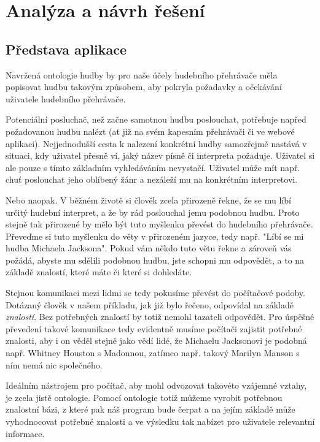 \chapter{Analýza a návrh řešení}

\section{Představa aplikace}
\label{chapter:requirements}

Navržená ontologie hudby by pro naše účely hudebního přehrávače měla popisovat hudbu takovým způsobem, aby pokryla požadavky a očekávání uživatele hudebního přehrávače.


Potenciální posluchač, než začne samotnou hudbu poslouchat, potřebuje napřed požadovanou hudbu nalézt (ať již na svém kapesním přehrávači či ve webové aplikaci).
Nejjednodušší cesta k nalezení konkrétní hudby samozřejmě nastává v situaci, kdy uživatel přesně ví, jaký název písně či interpreta požaduje. Uživatel si ale pouze s tímto základním vyhledáváním nevystačí.
Uživatel může mít např. chuť poslouchat jeho oblíbený žánr a nezáleží mu na konkrétním interpretovi. 

Nebo naopak. V běžném životě si člověk zcela přirozeně řekne, že se mu líbí určitý hudební interpret, a že by rád poslouchal jemu podobnou hudbu. Proto stejně tak přirozené by mělo být tuto myšlenku převést do hudebního přehrávače.
Převeďme si tuto myšlenku do věty v přirozeném jazyce, tedy např. "Líbí se mi hudba Michaela Jacksona". 
Pokud vám někdo tuto větu řekne a zároveň vás požádá, abyste mu sdělili podobnou hudbu, jste schopni mu odpovědět, a to na základě znalostí, které máte či které si dohledáte.
 
Stejnou komunikaci mezi lidmi se tedy pokusíme převést do počítačové podoby. 
Dotázaný člověk v našem příkladu, jak již bylo řečeno, odpovídal na základě \textit{znalostí}. Bez potřebných znalostí by totiž nemohl tazateli odpovědět.
Pro úspěšné převedení takové komunikace tedy evidentně musíme počítači zajistit potřebné znalosti, aby i on věděl stejně jako vědí lidé, že Michaelu Jacksonovi je podobná např. Whitney Houston s Madonnou, zatímco např. takový Marilyn Manson s ním nemá nic společného. 

Ideálním nástrojem pro počítač, aby mohl odvozovat takovéto vzájemné vztahy, je zcela jistě ontologie.
Pomocí ontologie totiž můžeme vyrobit potřebnou znalostní bázi, z které pak náš program bude čerpat a na jejím základě může vyhodnocovat potřebné znalosti a ve výsledku tak nabízet pro uživatele relevantní informace.


